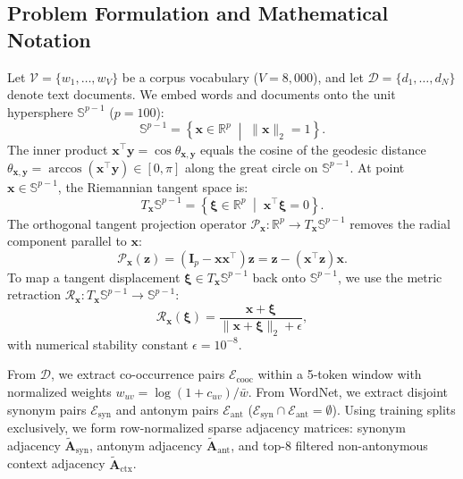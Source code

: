\documentclass[journal]{IEEEtran}
\begin{document}
\subsection{Problem Formulation and Mathematical Notation}
Let $\mathcal{V} = \{w_1, \dots, w_V\}$ be a corpus vocabulary ($V = 8,000$), and let $\mathcal{D} = \{d_1, \dots, d_N\}$ denote text documents. We embed words and documents onto the unit hypersphere $\mathbb{S}^{p-1}$ ($p = 100$):
\begin{equation}
\mathbb{S}^{p-1} = \left\{ \mathbf{x} \in \mathbb{R}^p \;\middle|\; \|\mathbf{x}\|_2 = 1 \right\}.
\label{eq:sphere_def}
\end{equation}
The inner product $\mathbf{x}^\top \mathbf{y} = \cos\theta_{\mathbf{x},\mathbf{y}}$ equals the cosine of the geodesic distance $\theta_{\mathbf{x},\mathbf{y}} = \arccos(\mathbf{x}^\top \mathbf{y}) \in [0, \pi]$ along the great circle on $\mathbb{S}^{p-1}$. At point $\mathbf{x} \in \mathbb{S}^{p-1}$, the Riemannian tangent space is:
\begin{equation}
T_{\mathbf{x}}\mathbb{S}^{p-1} = \left\{ \boldsymbol{\xi} \in \mathbb{R}^p \;\middle|\; \mathbf{x}^\top \boldsymbol{\xi} = 0 \right\}.
\label{eq:tangent_space}
\end{equation}
The orthogonal tangent projection operator $\mathcal{P}_{\mathbf{x}}: \mathbb{R}^p \to T_{\mathbf{x}}\mathbb{S}^{p-1}$ removes the radial component parallel to $\mathbf{x}$:
\begin{equation}
\mathcal{P}_{\mathbf{x}}(\mathbf{z}) = (\mathbf{I}_p - \mathbf{x}\mathbf{x}^\top)\mathbf{z} = \mathbf{z} - (\mathbf{x}^\top \mathbf{z})\mathbf{x}.
\label{eq:tangent_proj}
\end{equation}
To map a tangent displacement $\boldsymbol{\xi} \in T_{\mathbf{x}}\mathbb{S}^{p-1}$ back onto $\mathbb{S}^{p-1}$, we use the metric retraction $\mathcal{R}_{\mathbf{x}}: T_{\mathbf{x}}\mathbb{S}^{p-1} \to \mathbb{S}^{p-1}$:
\begin{equation}
\mathcal{R}_{\mathbf{x}}(\boldsymbol{\xi}) = \frac{\mathbf{x} + \boldsymbol{\xi}}{\|\mathbf{x} + \boldsymbol{\xi}\|_2 + \epsilon},
\label{eq:retraction}
\end{equation}
with numerical stability constant $\epsilon = 10^{-8}$.

From $\mathcal{D}$, we extract co-occurrence pairs $\mathcal{E}_{\text{cooc}}$ within a 5-token window with normalized weights $w_{uv} = \log(1 + c_{uv}) / \bar{w}$. From WordNet, we extract disjoint synonym pairs $\mathcal{E}_{\text{syn}}$ and antonym pairs $\mathcal{E}_{\text{ant}}$ ($\mathcal{E}_{\text{syn}} \cap \mathcal{E}_{\text{ant}} = \emptyset$). Using training splits exclusively, we form row-normalized sparse adjacency matrices: synonym adjacency $\tilde{\mathbf{A}}_{\text{syn}}$, antonym adjacency $\tilde{\mathbf{A}}_{\text{ant}}$, and top-$8$ filtered non-antonymous context adjacency $\tilde{\mathbf{A}}_{\text{ctx}}$.
\end{document}
